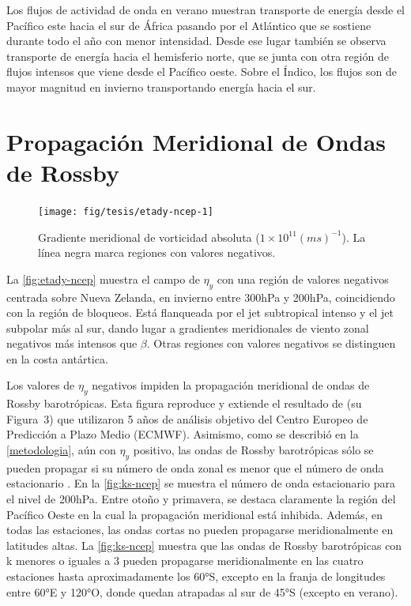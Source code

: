 \documentclass[spanish,a4paper,12pt,oneside]{book}
\begin{document}
Los flujos de actividad de onda en verano muestran transporte de energía
desde el Pacífico este hacia el sur de África pasando por el Atlántico
que se sostiene durante todo el año con menor intensidad. Desde ese
lugar también se observa transporte de energía hacia el hemisferio
norte, que se junta con otra región de flujos intensos que viene desde
el Pacífico oeste. Sobre el Índico, los flujos son de mayor magnitud en
invierno transportando energía hacia el sur.

\section{Propagación Meridional de Ondas de
Rossby}\label{propagacion-meridional-de-ondas-de-rossby}

\begin{landscape}\begin{figure}

{\centering \texttt{[image: fig/tesis/etady-ncep-1]} 

}

\caption{Gradiente meridional de vorticidad absoluta ($1\times10^11(ms)^{-1}$). La línea negra marca regiones con valores negativos.}\label{fig:etady-ncep}
\end{figure}
\end{landscape}

La \autoref{fig:etady-ncep} muestra el campo de \(\eta_y\) con una
región de valores negativos centrada sobre Nueva Zelanda, en invierno
entre 300hPa y 200hPa, coincidiendo con la región de bloqueos. Está
flanqueada por el jet subtropical intenso y el jet subpolar más al sur,
dando lugar a gradientes meridionales de viento zonal negativos más
intensos que \(\beta\). Otras regiones con valores negativos se
distinguen en la costa antártica.

Los valores de \(\eta_{y}\) negativos impiden la propagación meridional
de ondas de Rossby barotrópicas. Esta figura reproduce y extiende el
resultado de \textcite{Berbery1992} (su Figura~3) que utilizaron 5 años
de análisis objetivo del Centro Europeo de Predicción a Plazo Medio
(ECMWF). Asimismo, como se describió en la \autoref{metodologia}, aún
con \(\eta_{y}\) positivo, las ondas de Rossby barotrópicas sólo se
pueden propagar si su número de onda zonal es menor que el número de
onda estacionario \autocite{James}. En la \autoref{fig:ks-ncep} se
muestra el número de onda estacionario para el nivel de 200hPa. Entre
otoño y primavera, se destaca claramente la región del Pacífico Oeste en
la cual la propagación meridional está inhibida. Además, en todas las
estaciones, las ondas cortas no pueden propagarse meridionalmente en
latitudes altas. La \autoref{fig:ks-ncep} muestra que las ondas de
Rossby barotrópicas con k menores o iguales a 3 pueden propagarse
meridionalmente en las cuatro estaciones hasta aproximadamente los 60°S,
excepto en la franja de longitudes entre 60°E y 120°O, donde quedan
atrapadas al sur de 45°S (excepto en verano).
\end{document}
